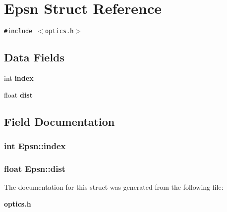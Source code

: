 \section{Epsn Struct Reference}
\label{structEpsn}
{\tt \#include $<$optics.h$>$}

\subsection*{Data Fields}
\begin{CompactItemize}
\item 
int {\bf index}
\item 
float {\bf dist}
\end{CompactItemize}


\subsection{Field Documentation}
\subsubsection{\setlength{\rightskip}{0pt plus 5cm}int {\bf Epsn::index}}\label{structEpsn_69742d3f690b80d007b5a4bcc854d7e7}


\subsubsection{\setlength{\rightskip}{0pt plus 5cm}float {\bf Epsn::dist}}\label{structEpsn_0077fcd8c7d870e7bc98c4385eca4d6c}




The documentation for this struct was generated from the following file:\begin{CompactItemize}
\item 
{\bf optics.h}\end{CompactItemize}

